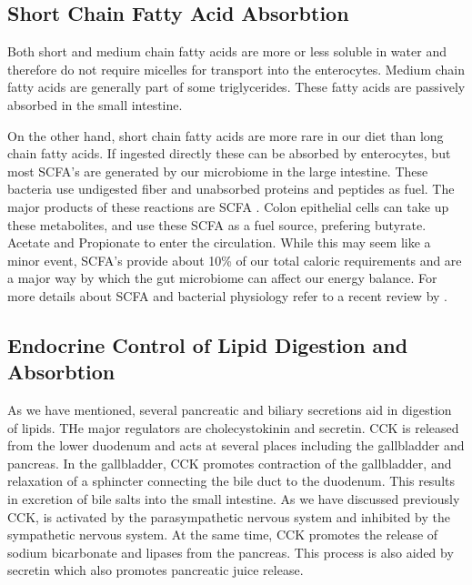 \documentclass{tufte-handout}
\begin{document}
\subsection{Short Chain Fatty Acid Absorbtion}

Both short and medium chain fatty acids are more or less soluble in water and therefore do not require micelles for transport into the enterocytes.  Medium chain fatty acids are generally part of some triglycerides.  These fatty acids are passively absorbed in the small intestine.

  On the other hand, short chain fatty acids are more rare in our diet than long chain fatty acids.  If ingested directly these can be absorbed by enterocytes, but most SCFA's are generated by our microbiome in the large intestine.  These bacteria use undigested fiber and unabsorbed proteins and peptides as fuel.  The major products of these reactions are SCFA \citep{Cummings1987}.  Colon epithelial cells can take up these metabolites, and use these SCFA as a fuel source, prefering butyrate.  Acetate and Propionate to enter the circulation.  While this may seem like a minor event, SCFA's provide about 10\% of our total caloric requirements and are a major way by which the gut microbiome can affect our energy balance.  For more details about SCFA and bacterial physiology refer to a recent review by \citet{Koh2016}.

\subsection{Endocrine Control of Lipid Digestion and Absorbtion}

As we have mentioned, several pancreatic and biliary secretions aid in digestion of lipids.  THe major regulators are cholecystokinin and secretin.  CCK is released from the lower duodenum and acts at several places including the gallbladder and pancreas.  In the gallbladder, CCK promotes contraction of the gallbladder, and relaxation of a sphincter connecting the bile duct to the duodenum.  This results in excretion of bile salts into the small intestine.  As we have discussed previously CCK, is activated by the parasympathetic nervous system and inhibited by the sympathetic nervous system.  At the same time, CCK promotes the release of sodium bicarbonate and lipases from the pancreas.  This process is also aided by secretin which also promotes pancreatic juice release.
\end{document}
